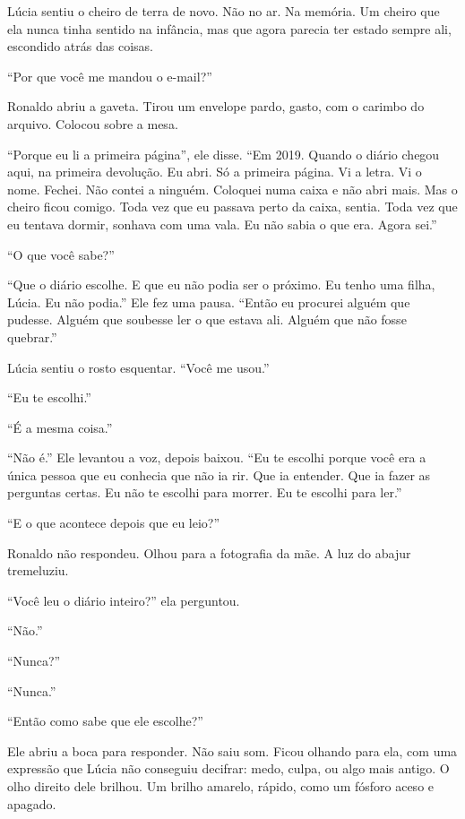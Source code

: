 \noindent Lúcia sentiu o cheiro de terra de novo. Não no ar. Na memória. Um cheiro que ela nunca tinha sentido na infância, mas que agora parecia ter estado sempre ali, escondido atrás das coisas.

\noindent ``Por que você me mandou o e-mail?''

\noindent Ronaldo abriu a gaveta. Tirou um envelope pardo, gasto, com o carimbo do arquivo. Colocou sobre a mesa.

\noindent ``Porque eu li a primeira página'', ele disse. ``Em 2019. Quando o diário chegou aqui, na primeira devolução. Eu abri. Só a primeira página. Vi a letra. Vi o nome. Fechei. Não contei a ninguém. Coloquei numa caixa e não abri mais. Mas o cheiro ficou comigo. Toda vez que eu passava perto da caixa, sentia. Toda vez que eu tentava dormir, sonhava com uma vala. Eu não sabia o que era. Agora sei.''

\noindent ``O que você sabe?''

\noindent ``Que o diário escolhe. E que eu não podia ser o próximo. Eu tenho uma filha, Lúcia. Eu não podia.'' Ele fez uma pausa. ``Então eu procurei alguém que pudesse. Alguém que soubesse ler o que estava ali. Alguém que não fosse quebrar.''

\noindent Lúcia sentiu o rosto esquentar. ``Você me usou.''

\noindent ``Eu te escolhi.''

\noindent ``É a mesma coisa.''

\noindent ``Não é.'' Ele levantou a voz, depois baixou. ``Eu te escolhi porque você era a única pessoa que eu conhecia que não ia rir. Que ia entender. Que ia fazer as perguntas certas. Eu não te escolhi para morrer. Eu te escolhi para ler.''

\noindent ``E o que acontece depois que eu leio?''

\noindent Ronaldo não respondeu. Olhou para a fotografia da mãe. A luz do abajur tremeluziu.

\noindent ``Você leu o diário inteiro?'' ela perguntou.

\noindent ``Não.''

\noindent ``Nunca?''

\noindent ``Nunca.''

\noindent ``Então como sabe que ele escolhe?''

\noindent Ele abriu a boca para responder. Não saiu som. Ficou olhando para ela, com uma expressão que Lúcia não conseguiu decifrar: medo, culpa, ou algo mais antigo. O olho direito dele brilhou. Um brilho amarelo, rápido, como um fósforo aceso e apagado.

